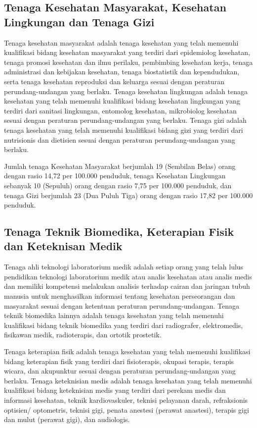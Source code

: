 \subsection{Tenaga Kesehatan Masyarakat, Kesehatan Lingkungan dan Tenaga Gizi}
Tenaga kesehatan masyarakat adalah tenaga kesehatan yang telah memenuhi kualifikasi bidang kesehatan masyarakat
yang terdiri dari epidemiolog kesehatan, tenaga promosi kesehatan dan ilmu perilaku, pembimbing kesehatan kerja,
tenaga administrasi dan kebijakan kesehatan, tenaga biostatistik dan kependudukan, serta tenaga kesehatan reproduksi
dan keluarga sesuai dengan peraturan perundang-undangan yang berlaku.
Tenaga kesehatan lingkungan adalah tenaga kesehatan yang telah memenuhi kualifikasi bidang kesehatan lingkungan yang terdiri dari sanitasi lingkungan,
entomolog kesehatan, mikrobiolog kesehatan sesuai dengan peraturan perundang-undangan yang berlaku.
Tenaga gizi adalah tenaga kesehatan yang telah memenuhi kualifikasi bidang gizi yang terdiri dari nutrisionis dan dietisien
sesuai dengan peraturan perundang-undangan yang berlaku.

Jumlah tenaga Kesehatan Masyarakat berjumlah 19 (Sembilan Belas) orang dengan rasio 14,72 per 100.000 penduduk, tenaga Kesehatan Lingkungan sebanyak 10 (Sepuluh) orang dengan rasio 7,75 per 100.000 penduduk, dan tenaga Gizi berjumlah 23 (Dua Puluh Tiga) orang dengan rasio 17,82 per 100.000 penduduk.

\subsection{Tenaga Teknik Biomedika, Keterapian Fisik dan Keteknisan Medik}
Tenaga ahli teknologi laboratorium medik adalah setiap orang yang telah lulus pendidikan teknologi laboratorium medik atau analis
kesehatan atau analis medis dan memiliki kompetensi melakukan analisis terhadap cairan dan jaringan tubuh manusia untuk
menghasilkan informasi tentang kesehatan perseorangan dan masyarakat sesuai dengan ketentuan peraturan perundang-undangan.
Tenaga teknik biomedika lainnya adalah tenaga kesehatan yang telah memenuhi kualifikasi bidang teknik biomedika yang terdiri dari radiografer, elektromedis, fisikawan medik, radioterapis, dan ortotik prostetik.

Tenaga keterapian fisik adalah tenaga kesehatan yang telah memenuhi kualifikasi bidang keterapian fisik yang terdiri
dari fisioterapis, okupasi terapis, terapis wicara, dan akupunktur sesuai dengan peraturan perundang-undangan yang
berlaku.
Tenaga keteknisian medis adalah tenaga kesehatan yang telah memenuhi kualifikasi bidang keteknisian medis yang
terdiri dari perekam medis dan informasi kesehatan, teknik kardiovaskuler, teknisi pelayanan darah, refraksionis
optisien/ optometris, teknisi gigi, penata anestesi (perawat anastesi), terapis gigi dan mulut (perawat gigi), dan audiologis.

